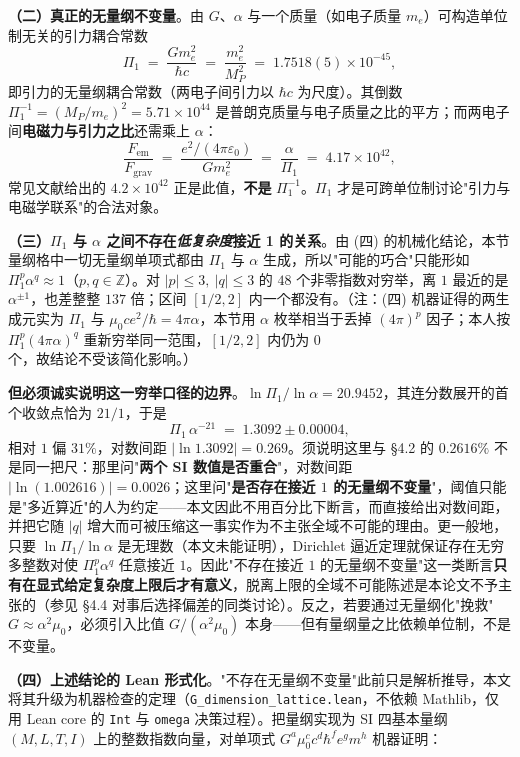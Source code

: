 \documentclass[12pt,a4paper]{article}
\begin{document}
\textbf{（二）真正的无量纲不变量}。由 $G$、$\alpha$ 与一个质量（如电子质量 $m_e$）可构造单位制无关的引力耦合常数
\begin{equation}
  \Pi_1 \;=\; \frac{G m_e^2}{\hbar c} \;=\; \frac{m_e^2}{M_P^2} \;=\; 1.7518(5)\times10^{-45},
\end{equation}
即引力的无量纲耦合常数（两电子间引力以 $\hbar c$ 为尺度）。其倒数 $\Pi_1^{-1} = (M_P/m_e)^2 = 5.71\times10^{44}$ 是普朗克质量与电子质量之比的平方；而两电子间\textbf{电磁力与引力之比}还需乘上 $\alpha$：
\[
  \frac{F_{\text{em}}}{F_{\text{grav}}} \;=\; \frac{e^2/(4\pi\varepsilon_0)}{G m_e^2} \;=\; \frac{\alpha}{\Pi_1} \;=\; 4.17\times10^{42},
\]
常见文献给出的 $4.2\times10^{42}$ 正是此值，\textbf{不是} $\Pi_1^{-1}$。$\Pi_1$ 才是可跨单位制讨论"引力与电磁学联系"的合法对象。

\textbf{（三）$\Pi_1$ 与 $\alpha$ 之间不存在\emph{低复杂度}接近 1 的关系}。由 (四) 的机械化结论，本节量纲格中一切无量纲单项式都由 $\Pi_1$ 与 $\alpha$ 生成，所以"可能的巧合"只能形如 $\Pi_1^{p}\alpha^{q}\approx 1$（$p,q\in\mathbb{Z}$）。对 $|p|\le 3,\ |q|\le 3$ 的 $48$ 个非零指数对穷举，离 $1$ 最近的是 $\alpha^{\pm1}$，也差整整 $137$ 倍；区间 $[1/2,2]$ 内一个都没有。（注：(四) 机器证得的两生成元实为 $\Pi_1$ 与 $\mu_0ce^2/\hbar = 4\pi\alpha$，本节用 $\alpha$ 枚举相当于丢掉 $(4\pi)^p$ 因子；本人按 $\Pi_1^{p}(4\pi\alpha)^{q}$ 重新穷举同一范围，$[1/2,2]$ 内仍为 $0$ 个，故结论不受该简化影响。）

\textbf{但必须诚实说明这一穷举口径的边界}。$\ln\Pi_1/\ln\alpha = 20.9452$，其连分数展开的首个收敛点恰为 $21/1$，于是
\[
  \Pi_1\,\alpha^{-21} \;=\; 1.3092 \pm 0.00004,
\]
相对 $1$ 偏 $31\%$，对数间距 $|\ln 1.3092| = 0.269$。须说明这里与 §4.2 的 $0.2616\%$ 不是同一把尺：那里问"\textbf{两个 SI 数值是否重合}"，对数间距 $|\ln(1.002616)| = 0.0026$；这里问"\textbf{是否存在接近 $1$ 的无量纲不变量}"，阈值只能是"多近算近"的人为约定——本文因此不用百分比下断言，而直接给出对数间距，并把它随 $|q|$ 增大而可被压缩这一事实作为不主张全域不可能的理由。更一般地，只要 $\ln\Pi_1/\ln\alpha$ 是无理数（本文未能证明），Dirichlet 逼近定理就保证存在无穷多整数对使 $\Pi_1^{p}\alpha^{q}$ 任意接近 $1$。因此"不存在接近 $1$ 的无量纲不变量"这一类断言\textbf{只有在显式给定复杂度上限后才有意义}，脱离上限的全域不可能陈述是本论文不予主张的（参见 §4.4 对事后选择偏差的同类讨论）。反之，若要通过无量纲化"挽救" $G \approx \alpha^2\mu_0$，必须引入比值 $G/(\alpha^2\mu_0)$ 本身——但有量纲量之比依赖单位制，不是不变量。

\textbf{（四）上述结论的 Lean 形式化}。"不存在无量纲不变量"此前只是解析推导，本文将其升级为机器检查的定理（\texttt{G\_\allowbreak{}dimension\_\allowbreak{}lattice.lean}，不依赖 Mathlib，仅用 Lean core 的 \texttt{Int} 与 \texttt{omega} 决策过程）。把量纲实现为 SI 四基本量纲 $(M,L,T,I)$ 上的整数指数向量，对单项式 $G^a \mu_0^{c} c^{d} \hbar^{f} e^{g} m^{h}$ 机器证明：
\end{document}

